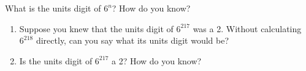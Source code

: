 \documentclass{book}
\begin{document}
\setcounter{project}{22}
\addtocounter{project}{-1}
\begin{activity}[]\label{activity-17}
\hypertarget{p-238}{}%
What is the units digit of \(6^n\)?  How do you know?%
\begin{enumerate}[font=\bfseries,label=(\alph*),ref=\alph*]
\item\label{task-26} \hypertarget{p-239}{}%
Suppose you knew that the units digit of \(6^{217}\) was a 2.  Without calculating \(6^{218}\) directly, can you say what its units digit would be?%
\item\label{task-27} \hypertarget{p-240}{}%
Is the units digit of \(6^{217}\) a 2?  How do you know?%
\end{enumerate}
\end{activity}
\end{document}
